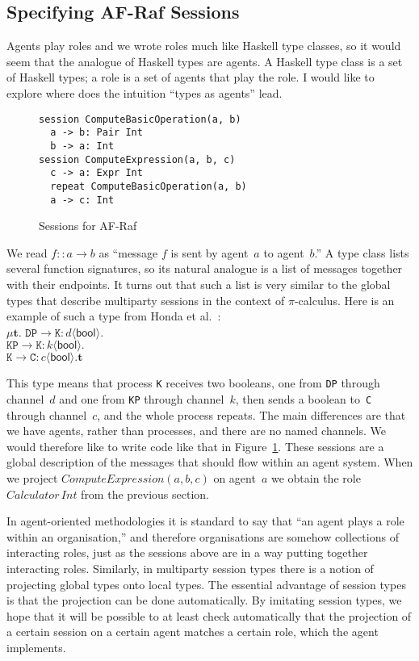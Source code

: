 \documentclass[a4paper,12pt,oneside,fleqn]{book} %
\theoremstyle{plain}
\theoremstyle{definition}
\theoremstyle{remark}
\begin{document}
\subsection{Specifying AF-Raf Sessions} %

Agents play roles and we wrote roles much like Haskell type
classes, so it would seem that the analogue of Haskell types are
agents. A Haskell type class is a set of Haskell types; a role is a
set of agents that play the role. I would like to explore where
does the intuition ``types as agents'' lead.

\begin{figure}\footnotesize %
\begin{verbatim}
session ComputeBasicOperation(a, b)
  a -> b: Pair Int
  b -> a: Int
session ComputeExpression(a, b, c)
  c -> a: Expr Int
  repeat ComputeBasicOperation(a, b)
  a -> c: Int
\end{verbatim}
\caption{Sessions for AF-Raf}\label{fig:sessions}
\end{figure} %

{\def\l#1->#2:#3<#4>{\mathtt{#1}\to\mathtt{#2}:#3\langle\mathsf{#4}\rangle}
We read $f::a\to b$ as ``message $f$ is sent by agent~$a$ to agent~$b$.'' A
type class lists several function signatures, so its natural analogue is a
list of messages together with their endpoints. It turns out that such a
list is very similar to the global types that describe multiparty sessions
in the context of $\pi$-calculus. Here is an example of such a type from
Honda et al.~\cite{dblp:conf/popl/hondayc08}:\\
$\mu\mathbf{t}.$
  $\l DP->K:d<bool>. $\\
  $\l KP->K:k<bool>. $\\
  $\l K->C:c<bool>.\mathbf{t}$

This type means that process \texttt{K} receives two booleans, one from
\texttt{DP} through channel~$d$ and one from \texttt{KP} through channel~$k$,
then sends a boolean to~\texttt{C} through channel~$c$, and the whole process
repeats. The main differences are that we have agents, rather than processes,
and there are no named channels. We would therefore like to write code like
that in Figure~\ref{fig:sessions}.  These sessions are a global description of
the messages that should flow within an agent system. When we project
$\mathit{ComputeExpression}(a,b,c)$ on agent~$a$ we obtain the role
$\mathit{Calculator}\,\mathit{Int}$ from the previous section.}

In agent-oriented methodologies it is standard to say that ``an agent plays
a role within an organisation,'' and therefore organisations are somehow
collections of interacting roles, just as the sessions above are in a way
putting together interacting roles. Similarly, in multiparty session types
there is a notion of projecting global types onto local types. The
essential advantage of session types is that the projection can be done
automatically. By imitating session types, we hope that it will be possible
to at least check automatically that the projection of a certain session on
a certain agent matches a certain role, which the agent implements.
\end{document}

